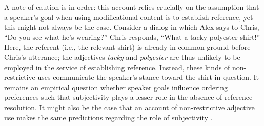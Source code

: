 \documentclass[preprint,authoryear]{elsarticle}\frenchspacing
\newcommand{\jd}[1]{\textcolor{Blue}{[jd: #1]}}
\newcommand{\gcs}[1]{\textcolor{blue}{[gcs: #1]}}
\begin{document}
A note of caution is in order: this account relies crucially on the assumption that a speaker's goal when using modificational content is to establish reference, yet this might not always be the case.  Consider a dialog in which Alex says to Chris, ``Do you see what he's wearing?'' Chris responds, ``What a tacky polyester shirt!'' Here, the referent (i.e., the relevant shirt) is already in common ground before Chris's utterance; the adjectives \emph{tacky} and \emph{polyester} are thus unlikely to be employed in the service of establishing reference. Instead, these kinds of non-restrictive uses communicate the speaker's stance toward the shirt in question. It remains an empirical question whether speaker goals influence ordering preferences such that subjectivity plays a lesser role in the absence of reference resolution. It might also be the case that an account of non-restrictive adjective use makes the same predictions regarding the role of subjectivity \citep[cf.][]{hahnetal2018}. %
\end{document}
